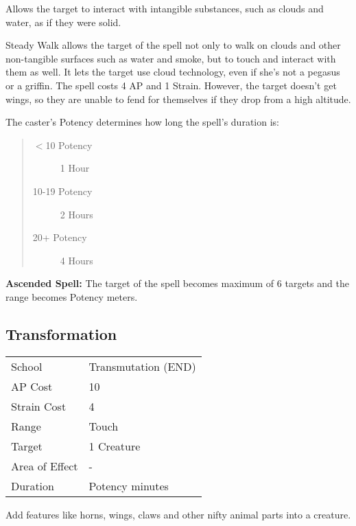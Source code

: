 \documentclass[11pt,a4paper,twocolumn]{book}
\begin{document}
\medskip

Allows the target to interact with intangible substances, such as clouds and water, as if they were solid.

Steady Walk allows the target of the spell not only to walk on clouds and other non-tangible surfaces such as water and smoke, but to touch and interact with them as well. It lets the target use cloud technology, even if she's not a pegasus or a griffin. The spell costs 4 AP and 1 Strain. However, the target doesn't get wings, so they are unable to fend for themselves if they drop from a high altitude.

The caster's Potency determines how long the spell's duration is:

\begin{quote}
	\begin{description}
		\item[$<$10 Potency] 	1 Hour
		\item[10-19 Potency] 	2 Hours
		\item[20+ Potency] 		4 Hours
	\end{description}	
\end{quote}

\bigskip

\textbf{Ascended Spell:} The target of the spell becomes maximum of 6 targets and the range becomes Potency meters.

\vfill

\subsection*{Transformation}
{
	\begin{tabu} to 75mm{| X[l,4] | X[l,7] |}
		\hline
		School 			& Transmutation (END) 		\\
		AP Cost	      	& 10 						\\
		Strain Cost     & 4 						 \\
		Range     		& Touch					    \\
		Target      	& 1 Creature		        \\
		Area of Effect  & - 	 				    \\
		Duration     	& Potency minutes			\\ \hline
	\end{tabu}
	
}

\medskip

Add features like horns, wings, claws and other nifty animal parts into a creature.
\end{document}

